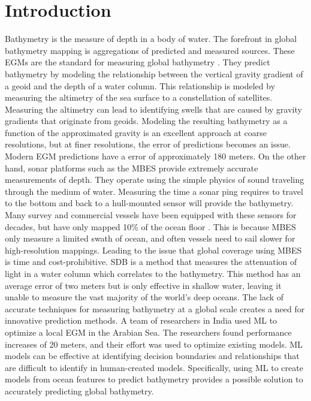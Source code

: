 
\section{Introduction}
\setlength{\parindent}{10ex}
Bathymetry is the measure of depth in a body of water.
The forefront in global bathymetry mapping is aggregations of predicted and measured sources. 
These \ac{EGM}s are the standard for measuring global bathymetry \cite{becker2009global}\cite{smith1994bathymetric}\cite{smith1997global}\cite{smith2010planning}.
They predict bathymetry by modeling the relationship between the vertical gravity gradient of a geoid and the depth of a water column.
This relationship is modeled by measuring the altimetry of the sea surface to a constellation of satellites.
Measuring the altimetry can lead to identifying swells that are caused by gravity gradients that originate from geoids.
Modeling the resulting bathymetry as a function of the approximated gravity is an excellent approach at coarse resolutions, but at finer resolutions, the error of predictions becomes an issue.
Modern \ac{EGM} predictions have a error of approximately 180 meters.
On the other hand, sonar platforms such as the \ac{MBES} \cite{farr1980multibeam} provide extremely accurate measurements of depth. 
They operate using the simple physics of sound traveling through the medium of water.
Measuring the time a sonar ping requires to travel to the bottom and back to a hull-mounted sensor will provide the bathymetry.
Many survey and commercial vessels have been equipped with these sensors for decades, but have only mapped 10\% of the ocean floor \cite{becker2009global}.
This is because \ac{MBES} only measure a limited swath of ocean, and often vessels need to sail slower for high-resolution mappings.
Leading to the issue that global coverage using \ac{MBES} is time and cost-prohibitive.
\ac{SDB} is a method that measures the attenuation of light in a water column which correlates to the bathymetry.
This method has an average error of two meters but is only effective in shallow water, leaving it unable to measure the vast majority of the world's deep oceans.
The lack of accurate techniques for measuring bathymetry at a global scale creates a need for innovative prediction methods.
A team of researchers in India \cite{jena2012prediction} used \ac{ML} to optimize a local \ac{EGM} in the Arabian Sea.
The researchers found performance increases of 20 meters, and their effort was used to optimize existing models.
\ac{ML} models can be effective at identifying decision boundaries and relationships that are difficult to identify in human-created models.
Specifically, using \ac{ML} to create models from ocean features to predict bathymetry provides a possible solution to accurately predicting global bathymetry.

